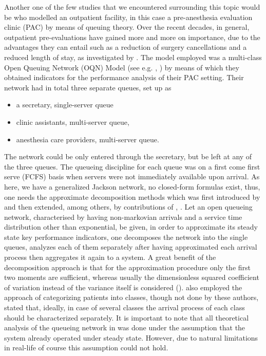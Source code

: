 \documentclass[11pt,a4paper]{article}
\begin{document}
\begin{spacing}{1.8}
 
 Another one of the few studies that we encountered surrounding this topic would be \citep{Zonderland2009} who modelled an outpatient facility, in this case a pre-anesthesia evaluation clinic (PAC) by means of  queuing theory. Over the recent decades, in general, outpatient pre-evaluations have gained more and more on importance, due to the advantages they can entail such as a reduction of surgery cancellations and a reduced length of stay, as investigated by  \citep{Klei2002}. 
  The model \citet{Zonderland2009} employed was a multi-class Open Queuing Network (OQN) Model (see e.g. \citep{Bitran1992}, \citep{Bitran2009})  by means of which they obtained indicators for the performance analysis of their PAC setting.  
Their network had in total three separate queues, set up as
\begin{itemize}
\item a secretary, single-server queue
\item clinic assistants, multi-server queue,
\item anesthesia care providers, multi-server queue.
\end{itemize}
The network could be only entered through the secretary, but be left at any of the three queues. 
The queueing discipline for each queue was on a first come first serve (FCFS) basis when servers were not immediately available upon arrival.  As here, we have a generalized Jackson network, no closed-form formulas exist, thus, one needs the approximate decomposition methods  which was first introduced by \citep{Reiser1975} and then extended, among others,  by contributions of \citep{Whitt1983}, \citep{Whitt1994}.
 Let an open queueing network, characterised by having non-markovian arrivals and a service time distribution other than exponential, be given,  in order to approximate its steady state key performance indicators, one decomposes the network into the single queues, analyzes each of them separately after having approximated each arrival process then aggregates it again to a system.
 A great benefit of the decomposition approach is that for the approximation procedure only the first two moments are sufficient, whereas usually the dimensionless squared coefficient of variation instead of the variance itself is considered (\citep{Bitran2009}).
\citet{Zonderland2009} also employed the approach of categorizing patients into classes, though not done by these authors, \citet{Whitt1995} stated that, ideally, in case of several classes the arrival process of each class should be characterized separately. It is important to note that all  theoretical analysis of the queueing network in \citep{Zonderland2009} was done under the assumption that the system already operated under steady state. However, due to natural limitations in real-life of course this assumption could not hold. 

\end{spacing}
\end{document}
